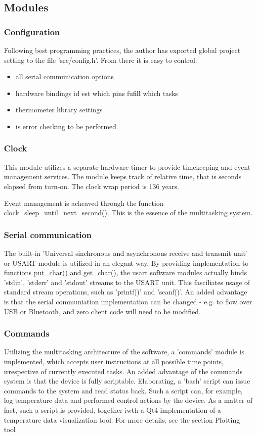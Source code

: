 \subsection{Modules}
\subsubsection{Configuration}
Following best programming practices, the author has exported global project setting to the file 'src/config.h'.
From there it is easy to control:
\begin{itemize}
\item{all serial communication options}
\item{hardware bindings id est which pins fufill which tasks}
\item{thermometer library settings}
\item{is error checking to be performed}
\end{itemize}

\subsubsection{Clock}
This module utilizes a separate hardware timer to provide timekeeping and event management services.
The module keeps track of relative time, that is seconds elapsed from turn-on.
The clock wrap period is 136 years.
\par
Event management is acheaved through the function clock\_sleep\_until\_next\_second().
This is the essence of the multitasking system.

\subsubsection{Serial communication}
The built-in 'Universal sinchronous and asynchronous receive and transmit unit' or USART module is utilized in an elegant way.
By providing implementation to functions put\_char() and get\_char(), the usart software modules actually binds 'stdin', 'stderr' and 'stdout' streams to the USART unit.
This fasciliates usage of standard stream operations, such as 'printf()' and 'scanf()'.
An added advantage is that the serial communiation implementation can be changed - e.g. to flow over USB or Bluetooth, and zero client code will need to be modified.

\subsubsection{Commands}
Utilizing the multitasking architecture of the software, a 'commands' module is implemented, which accepts user instructions at all possible time points, irrespective of currently executed tasks.
An added advantage of the commands system is that the device is fully scriptable.
Elaborating, a 'bash' script can issue commands to the system and read status back.
Such a script can, for example, log temperature data and performed control actions by the device.
As a matter of fact, such a script is provided, together iwth a Qt4 implementation of a temperature data visualization tool.
For more details, see the section Plotting tool


